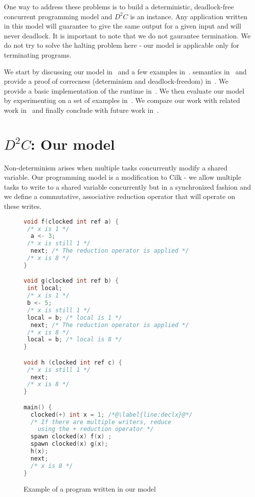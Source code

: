 \documentclass[10pt, conference, compsocconf]{IEEEtran}
\begin{document}
One way to address these problems is to build a deterministic, deadlock-free concurrent programming
model and $D^2C$ is an instance. 
Any application written in this model will guarantee to give 
the same output for a given input
and will never deadlock. 
It is important to note that we do not gaurantee termination.
We do not try to solve the halting problem here - our model is applicable
only for terminating programs.


We start by discussing our model in~ and a few examples in~. 
 semantics in~ and provide a proof of correcness (determinism and deadlock-freedom) in~. 
We provide a basic implementation of the runtime in~. 
We then evaluate our model by experimenting on a set of examples in~. 
We compare our work with related work in~ and finally conclude with future work in~.



\section{$D^2C$: Our model}
\label{sec:model}

Non-determinism arises when multiple tasks concurrently modify a shared variable.
Our programming model is a modification to Cilk - we allow multiple tasks to write to
a shared variable concurrently but in a synchronized fashion and we define a commutative, associative
reduction operator that will operate on these
writes.
\begin{figure}
\begin{lstlisting}[language=C]
void f(clocked int ref a) {
 /* x is 1 */
  a <- 3;
 /* x is still 1 */
  next; /* The reduction operator is applied */
 /* x is 8 */
}

void g(clocked int ref b) {
 int local;
 /* x is 1 */
 b <- 5;
 /* x is still 1 */
 local = b; /* local is 1 */
  next; /* The reduction operator is applied */
 /* x is 8 */
 local = b; /* local is 8 */
}

void h (clocked int ref c) {
 /* x is still 1 */
  next;
 /* x is 8 */
}

main() {
  clocked(+) int x = 1; /*@\label{line:declx}@*/
  /* If there are multiple writers, reduce
    using the + reduction operator */
  spawn clocked(x) f(x) ;
  spawn clocked(x) g(x);
  h(x);
  next;
  /* x is 8 */
}
\end{lstlisting}
\caption{Example of a program written in our model}
\label{fig:ddc}
\end{figure}
\end{document}
